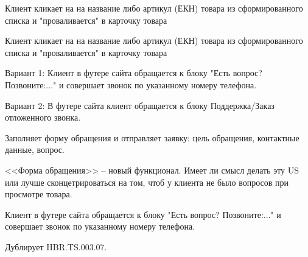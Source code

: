 {


\begin{wiki}
Клиент кликает на на название либо артикул (ЕКН) товара из сформированного списка и "проваливается" в карточку товара
\end{wiki}


\begin{itogo}
Клиент кликает на на название либо артикул (ЕКН) товара из сформированного списка и "проваливается" в карточку товара
\end{itogo}
}


{

\begin{wiki}
Вариант 1: Клиент в футере сайта обращается к блоку "Есть вопрос? Позвоните:..." и совершает звонок по указанному номеру телефона.
 
Вариант 2: В футере сайта клиент обращается к блоку Поддержка/Заказ отложенного звонка.
 
Заполняет форму обращения и отправляет заявку: цель обращения, контактные данные, вопрос.
\end{wiki}

\begin{teamidea}
<<Форма обращения>> -- новый функционал. Имеет ли смысл делать эту US или лучше сконцетрироваться на том, чтоб у клиента не было вопросов при просмотре товара.
\end{teamidea}


\begin{itogo}
Клиент в футере сайта обращается к блоку "Есть вопрос? Позвоните:..." и совершает звонок по указанному номеру телефона.
\end{itogo}

}
{
Дублирует HBR.TS.003.07.
}

